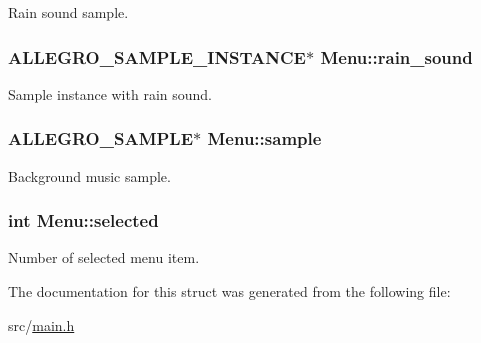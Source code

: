 Rain sound sample. \hypertarget{structMenu_a31b58f4005206ba8ecc4b6f40223295f}{
\subsubsection[{rain\-\_\-sound}]{\setlength{\rightskip}{0pt plus 5cm}A\-L\-L\-E\-G\-R\-O\-\_\-\-S\-A\-M\-P\-L\-E\-\_\-\-I\-N\-S\-T\-A\-N\-C\-E$\ast$ Menu\-::rain\-\_\-sound}}\label{structMenu_a31b58f4005206ba8ecc4b6f40223295f}
Sample instance with rain sound. \hypertarget{structMenu_a19a25811d2d08b8fa1d1819088168b72}{
\subsubsection[{sample}]{\setlength{\rightskip}{0pt plus 5cm}A\-L\-L\-E\-G\-R\-O\-\_\-\-S\-A\-M\-P\-L\-E$\ast$ Menu\-::sample}}\label{structMenu_a19a25811d2d08b8fa1d1819088168b72}
Background music sample. \hypertarget{structMenu_a608e2768a5458057048bf1c7ab9a81aa}{
\subsubsection[{selected}]{\setlength{\rightskip}{0pt plus 5cm}int Menu\-::selected}}\label{structMenu_a608e2768a5458057048bf1c7ab9a81aa}
Number of selected menu item. 

The documentation for this struct was generated from the following file\-:\begin{DoxyCompactItemize}
\item 
src/\hyperlink{main_8h}{main.\-h}\end{DoxyCompactItemize}

